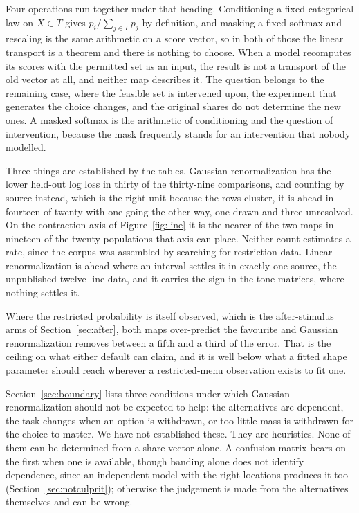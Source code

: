 \documentclass[11pt]{article}
\begin{document}
Four operations run together under that heading. Conditioning a fixed categorical law on
$X \in T$ gives $p_i / \sum_{j \in T} p_j$ by definition, and masking a fixed softmax and
rescaling is the same arithmetic on a score vector, so in both of those the linear transport is a
theorem and there is nothing to choose. When a model recomputes its scores with the permitted set
as an input, the result is not a transport of the old vector at all, and neither map describes it.
The question belongs to the remaining case, where the feasible set is intervened upon, the
experiment that generates the choice changes, and the original shares do not determine the new
ones. A masked softmax is the arithmetic of conditioning and the question of intervention,
because the mask frequently stands for an intervention that nobody modelled.

Three things are established by the tables. Gaussian renormalization has the lower held-out log
loss in thirty of the thirty-nine comparisons, and counting by source instead, which is the
right unit because the rows cluster, it is ahead in fourteen of twenty with one going the other
way, one drawn and three unresolved. On the contraction axis of Figure~\ref{fig:line} it is the
nearer of the two maps in nineteen of the twenty populations that axis can place. Neither count
estimates a rate, since the corpus was assembled by searching for restriction data. Linear
renormalization is ahead where an interval settles it in exactly one source, the unpublished
twelve-line data, and it carries the sign in the tone matrices, where nothing settles it.

Where the restricted probability is itself observed, which is the after-stimulus arms of
Section~\ref{sec:after}, both maps over-predict the favourite and Gaussian renormalization removes
between a fifth and a third of the error. That is the ceiling on what either default can claim,
and it is well below what a fitted shape parameter should reach wherever a restricted-menu
observation exists to fit one.

Section~\ref{sec:boundary} lists three conditions under which Gaussian renormalization should
not be expected to help: the alternatives are dependent, the task changes when an option is
withdrawn, or too little mass is withdrawn for the choice to matter. We have not established
these. They are heuristics. None of them can be determined from a share vector alone. A confusion
matrix bears on the first when one is available, though banding alone does not identify
dependence, since an independent model with the right locations produces it too
(Section~\ref{sec:notculprit}); otherwise the judgement is made from the alternatives themselves
and can be wrong.
\end{document}
